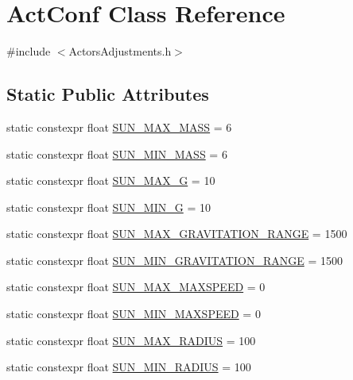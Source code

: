 \hypertarget{class_act_conf}{\section{Act\+Conf Class Reference}
\label{class_act_conf}
}


{\ttfamily \#include $<$Actors\+Adjustments.\+h$>$}

\subsection*{Static Public Attributes}
\begin{DoxyCompactItemize}
\item 
static constexpr float \hyperlink{class_act_conf_a464a997ad2cffe00af6b7df7ea204540}{S\+U\+N\+\_\+\+M\+A\+X\+\_\+\+M\+A\+S\+S} = 6
\item 
static constexpr float \hyperlink{class_act_conf_a14ed8e2d2f55acb19e13db7ae2c62ede}{S\+U\+N\+\_\+\+M\+I\+N\+\_\+\+M\+A\+S\+S} = 6
\item 
static constexpr float \hyperlink{class_act_conf_a6fc1372506c0175a34f9bfb8ed45d4f1}{S\+U\+N\+\_\+\+M\+A\+X\+\_\+\+G} = 10
\item 
static constexpr float \hyperlink{class_act_conf_aa7b9294d254231d2b475d082e7f95805}{S\+U\+N\+\_\+\+M\+I\+N\+\_\+\+G} = 10
\item 
static constexpr float \hyperlink{class_act_conf_acba0bf155001449bb4b5c0d0b0095c1c}{S\+U\+N\+\_\+\+M\+A\+X\+\_\+\+G\+R\+A\+V\+I\+T\+A\+T\+I\+O\+N\+\_\+\+R\+A\+N\+G\+E} = 1500
\item 
static constexpr float \hyperlink{class_act_conf_afce1a66b5b354b7063200d2e558a3d1a}{S\+U\+N\+\_\+\+M\+I\+N\+\_\+\+G\+R\+A\+V\+I\+T\+A\+T\+I\+O\+N\+\_\+\+R\+A\+N\+G\+E} = 1500
\item 
static constexpr float \hyperlink{class_act_conf_a06d2d70436d034d145a06e08bcde1328}{S\+U\+N\+\_\+\+M\+A\+X\+\_\+\+M\+A\+X\+S\+P\+E\+E\+D} = 0
\item 
static constexpr float \hyperlink{class_act_conf_a63ce743840a61cd89de691b5f4b54f51}{S\+U\+N\+\_\+\+M\+I\+N\+\_\+\+M\+A\+X\+S\+P\+E\+E\+D} = 0
\item 
static constexpr float \hyperlink{class_act_conf_aefebfa3bc4082736650e3aa9b73d7645}{S\+U\+N\+\_\+\+M\+A\+X\+\_\+\+R\+A\+D\+I\+U\+S} = 100
\item 
static constexpr float \hyperlink{class_act_conf_aaca11dfebfee923c701bd24349cf4804}{S\+U\+N\+\_\+\+M\+I\+N\+\_\+\+R\+A\+D\+I\+U\+S} = 100
\item 

\end{DoxyCompactItemize}
